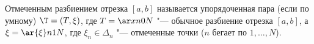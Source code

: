 
 	Отмеченным разбиением отрезка $[a,b]$ называется упорядоченная пара (если по умному) $\T=(T,\xi)$, где
 	$T=\ar xn0N$ "--- обычное разбиение отрезка $[a,b]$, а 
 	$\xi=\ar{\xi}n1N$, где $\xi_n\in\Delta_n$ "--- отмеченные точки ($n$ бегает по $1,\ldots,N$).
 